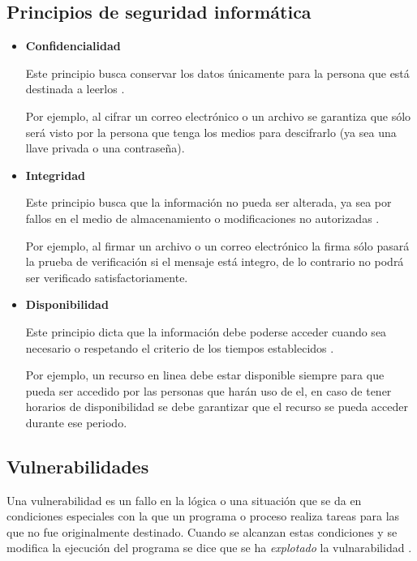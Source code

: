   \subsection {Principios de seguridad inform\'{a}tica}

\begin{itemize}

  \item \textbf{Confidencialidad}

Este principio busca conservar los datos \'{u}nicamente para la persona que est\'{a} destinada a leerlos \cite{_nist_????} \cite{_information_????}.

Por ejemplo, al cifrar un correo electr\'{o}nico o un archivo se garantiza que s\'{o}lo ser\'{a} visto por la persona que tenga los medios para descifrarlo (ya sea una llave privada o una contrase\~{n}a).

  \item \textbf{Integridad}

Este principio busca que la informaci\'{o}n no pueda ser alterada, ya sea por fallos en el medio de almacenamiento o modificaciones no autorizadas \cite{_nist_????} \cite{_information_????}.

Por ejemplo, al firmar un archivo o un correo electr\'{o}nico la firma s\'{o}lo pasar\'{a} la prueba de verificaci\'{o}n si el mensaje est\'{a} integro, de lo contrario no podr\'{a} ser verificado satisfactoriamente.

  \item \textbf{Disponibilidad}

Este principio dicta que la informaci\'{o}n debe poderse acceder cuando sea necesario o respetando el criterio de los tiempos establecidos \cite{_nist_????} \cite{_information_????}.

Por ejemplo, un recurso en linea debe estar disponible siempre para que pueda ser accedido por las personas que har\'{a}n uso de el, en caso de tener horarios de disponibilidad se debe garantizar que el recurso se pueda acceder durante ese periodo.

\end{itemize}

  \subsection {Vulnerabilidades}

Una vulnerabilidad es un fallo en la l\'{o}gica o una situaci\'{o}n que se da en condiciones especiales con la que un programa o proceso realiza tareas para las que no fue originalmente destinado. Cuando se alcanzan estas condiciones y se modifica la ejecuci\'{o}n del programa se dice que se ha \textit{explotado} la vulnarabilidad \cite{padilla_buenas_2009}.

